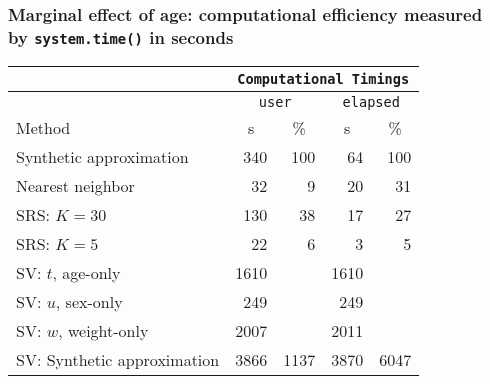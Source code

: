 \documentclass[11pt,dvipsnames,usenames,times]{beamer}
\begin{document}
\begin{frame}\frametitle{Marginal effect of age: 
computational efficiency measured \\
 by {\tt system.time()} in seconds} 
\begin{center}
\begin{tabular}{l|rr|rr}
& \multicolumn{4}{c}{\tt Computational Timings} \\ \hline
& \multicolumn{2}{c|}{\tt user} & \multicolumn{2}{c}{\tt elapsed} \\
Method & \multicolumn{1}{c}{s} & \multicolumn{1}{c|}{\%}  
& \multicolumn{1}{c}{s} & \multicolumn{1}{c}{\%} \\ \hline
Synthetic approximation   & 340 & 100 &  64 & 100 \\
Nearest neighbor &  32 &   9 &  20 &  31 \\
SRS: $K=30$          & 130 &  38 &  17 &  27 \\
SRS: $K=5$           & 22  &   6 &   3 &   5 \\  \hline
SV: $t$, age-only   &1610 &     &1610 & \\    
SV: $u$, sex-only   & 249 &     & 249 & \\    
SV: $w$, weight-only&2007 &     &2011 & \\    
SV: Synthetic approximation
                      &3866 &1137 &3870 &6047   
\end{tabular}
\end{center}
\end{frame}
\end{document}

